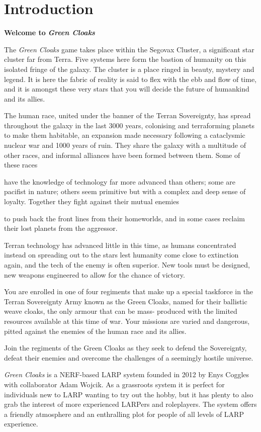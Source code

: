 \part{Introduction}

\textbf{Welcome to} \textbf{\textit{Green Cloaks}}

The \textit{Green Cloaks} game takes place within the Segovax Cluster, a significant star cluster far from Terra. Five systems here form the bastion of humanity on this isolated fringe of the galaxy. The cluster is a place ringed in beauty, mystery and legend. It is here the fabric of reality is said to flex with the ebb and flow of time, and it is amongst these very stars that you will decide the future of humankind and its allies.

The human race, united under the banner of the Terran Sovereignty, has spread throughout the galaxy in the last 3000 years, colonising and terraforming planets to make them habitable, an expansion made necessary following a cataclysmic nuclear war and 1000 years of ruin. They share the galaxy with a multitude of other races, and informal alliances have been formed between them. Some of these races

have the knowledge of technology far more advanced than others; some are pacifist in nature; others seem primitive but with a complex and deep sense of loyalty. Together they fight against their mutual enemies

to push back the front lines from their homeworlds, and in some cases reclaim their lost planets from the aggressor.

Terran technology has advanced little in this time, as humans concentrated instead on spreading out to the stars lest humanity come close to extinction again, and the tech of the enemy is often superior. New tools must be designed, new weapons engineered to allow for the chance of victory.

You are enrolled in one of four regiments that make up a special taskforce in the Terran Sovereignty Army known as the Green Cloaks, named for their ballistic weave cloaks, the only armour that can be mass- produced with the limited resources available at this time of war. Your missions are varied and dangerous, pitted against the enemies of the human race and its allies.

Join the regiments of the Green Cloaks as they seek to defend the Sovereignty, defeat their enemies and overcome the challenges of a seemingly hostile universe.

\textit{Green Cloaks} is a NERF-based LARP system founded in 2012 by Enys Coggles with collaborator Adam Wojcik. As a grassroots system it is perfect for individuals new to LARP wanting to try out the hobby, but it has plenty to also grab the interest of more experienced LARPers and roleplayers. The system offers a friendly atmosphere and an enthralling plot for people of all levels of LARP experience.

